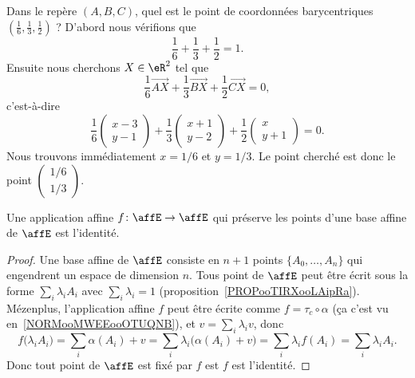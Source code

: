\begin{example}
    Dans le repère \( (A,B,C)\), quel est le point de coordonnées barycentriques \( (\frac{1}{ 6 },\frac{1}{ 3 },\frac{1}{ 2 })\) ? D'abord nous vérifions que
    \begin{equation}
        \frac{1}{ 6 }+\frac{1}{ 3 }+\frac{1}{ 2 }=1.
    \end{equation}
    Ensuite nous cherchons \( X\in \eR^2\) tel que
    \begin{equation}
        \frac{1}{ 6 }\overrightarrow{ AX }+\frac{1}{ 3 }\overrightarrow{ BX }+\frac{1}{ 2 }\overrightarrow{ CX }=0,
    \end{equation}
    c'est-à-dire
    \begin{equation}
        \frac{1}{ 6 }\begin{pmatrix}
            x-3    \\
            y-1
        \end{pmatrix}+\frac{1}{ 3 }\begin{pmatrix}
            x+1    \\
            y-2
        \end{pmatrix}+\frac{1}{ 2 }\begin{pmatrix}
            x    \\
            y+1
        \end{pmatrix}=0.
    \end{equation}
    Nous trouvons immédiatement \( x=1/6\) et \( y=1/3\). Le point cherché est donc le point \( \begin{pmatrix}
        1/6    \\
        1/3
    \end{pmatrix}\).
\end{example}

\begin{lemma}       \label{LEMooDUMVooFtfFOe}
    Une application affine \( f\colon \affE\to \affE\) qui préserve les points d'une base affine de $\affE$ est l'identité.
\end{lemma}

\begin{proof}
    Une base affine de \( \affE\) consiste en \( n+1\) points \( \{ A_0,\ldots, A_n \}\) qui engendrent un espace de dimension \( n\). Tous point de \( \affE\) peut être écrit sous la forme \( \sum_i\lambda_iA_i\) avec \( \sum_i\lambda_i=1\) (proposition~\ref{PROPooTIRXooLAipRa}). Mézenplus, l'application affine \( f\) peut être écrite comme \( f=\tau_c\circ \alpha\) (ça c'est vu en~\ref{NORMooMWEEooOTUQNB}), et \( v=\sum_i\lambda_iv\), donc
    \begin{equation}
        f\big( \lambda_iA_i)=\sum_i\alpha(A_i)+v
        =\sum_i\lambda_i\big( \alpha(A_i)+v \big)
        =\sum_i\lambda_if(A_i)
        =\sum_i\lambda_iA_i.
    \end{equation}
    Donc tout point de \( \affE\) est fixé par \( f\) est \( f\) est l'identité.
\end{proof}

